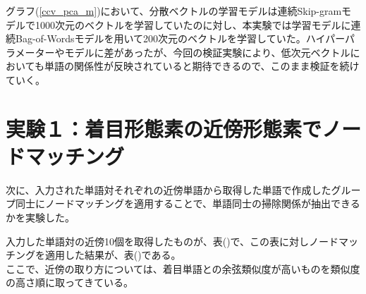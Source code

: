 グラフ(\ref{ccv_pca_m})\cite{drwpc}において、分散ベクトルの学習モデルは連続Skip-gramモデルで1000次元のベクトルを学習していたのに対し、本実験では学習モデルに連続Bag-of-Wordsモデルを用いて200次元のベクトルを学習していた。ハイパーパラメーターやモデルに差があったが、今回の検証実験により、低次元ベクトルにおいても単語の関係性が反映されていると期待できるので、このまま検証を続けていく。

\section{実験１：着目形態素の近傍形態素でノードマッチング}
次に、入力された単語対それぞれの近傍単語から取得した単語で作成したグループ同士にノードマッチングを適用することで、単語同士の掃除関係が抽出できるかを実験した。

入力した単語対の近傍10個を取得したものが、表()で、この表に対しノードマッチングを適用した結果が、表()である。\\
ここで、近傍の取り方については、着目単語との余弦類似度が高いものを類似度の高さ順に取ってきている。

